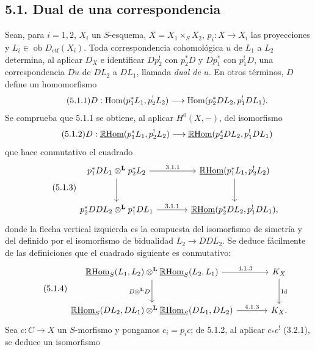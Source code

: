 \subsection*{5.1. Dual de una correspondencia}

Sean, para $i=1,2$, $X_i$ un $S$-esquema, $X=X_1\times_S X_2$, $p_i:X\to X_i$ las proyecciones y $L_i\in\operatorname{ob}D_{\mathrm{ctf}}(X_i)$. Toda correspondencia cohomológica $u$ de $L_1$ a $L_2$ determina, al aplicar $D_X$ e identificar $Dp_2^!$ con $p_2^*D$ y $Dp_1^*$ con $p_1^!D$, una correspondencia $Du$ de $DL_2$ a $DL_1$, llamada \emph{dual de $u$}. En otros términos, $D$ define un homomorfismo
\begin{equation}
\tag{5.1.1}
D:\operatorname{Hom}(p_1^*L_1,p_2^!L_2)\longrightarrow \operatorname{Hom}(p_2^*DL_2,p_1^!DL_1).
\end{equation}
Se comprueba que 5.1.1 se obtiene, al aplicar $H^0(X,-)$, del isomorfismo
\begin{equation}
\tag{5.1.2}
D:\underline{\mathbb{R}\mathrm{Hom}}(p_1^*L_1,p_2^!L_2)\longrightarrow\underline{\mathbb{R}\mathrm{Hom}}(p_2^*DL_2,p_1^!DL_1)
\end{equation}
que hace conmutativo el cuadrado
\begin{equation}
\tag{5.1.3}
\begin{tikzcd}[column sep=large,row sep=large]
p_1^*DL_1\otimes^{\mathbf L}p_2^*L_2 \arrow[r,"3.1.1"] \arrow[d]
& \uRHom(p_1^*L_1,p_2^!L_2) \arrow[d] \\
p_2^*DDL_2\otimes^{\mathbf L}p_1^*DL_1 \arrow[r,"3.1.1"]
& \uRHom(p_2^*DL_2,p_1^!DL_1),
\end{tikzcd}
\end{equation}
donde la flecha vertical izquierda es la compuesta del isomorfismo de simetría y del definido por el isomorfismo de bidualidad $L_2\to DDL_2$. Se deduce fácilmente de las definiciones que el cuadrado siguiente es conmutativo:
\begin{equation}
\tag{5.1.4}
\begin{tikzcd}[column sep=large,row sep=large]
\uRHom_S(L_1,L_2)\otimes^{\mathbf L}\uRHom_S(L_2,L_1) \arrow[r,"4.1.3"] \arrow[d,"D\otimes^{\mathbf L} D"']
& K_X \arrow[d,"\operatorname{Id}"] \\
\uRHom_S(DL_2,DL_1)\otimes^{\mathbf L}\uRHom_S(DL_1,DL_2) \arrow[r,"4.1.3"]
& K_X.
\end{tikzcd}
\end{equation}
Sea $c:C\to X$ un $S$-morfismo y pongamos $c_i=p_ic$; de 5.1.2, al aplicar $c_*c^!$ (3.2.1), se deduce un isomorfismo
